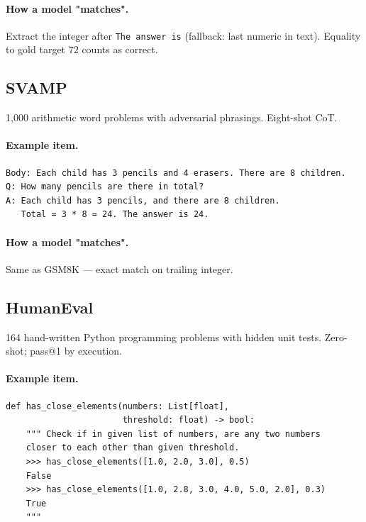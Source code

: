 \paragraph{How a model "matches".} Extract the integer after
\verb|The answer is| (fallback: last numeric in text). Equality to
gold target $72$ counts as correct.

\subsection{SVAMP}
\label{app:ex-svamp}

1{,}000 arithmetic word problems with adversarial phrasings.
Eight-shot CoT.

\paragraph{Example item.}
\begin{verbatim}
Body: Each child has 3 pencils and 4 erasers. There are 8 children.
Q: How many pencils are there in total?
A: Each child has 3 pencils, and there are 8 children.
   Total = 3 * 8 = 24. The answer is 24.
\end{verbatim}

\paragraph{How a model "matches".} Same as GSM8K — exact match on
trailing integer.

\subsection{HumanEval}
\label{app:ex-humaneval}

164 hand-written Python programming problems with hidden unit
tests. Zero-shot; pass@1 by execution.

\paragraph{Example item.}
\begin{verbatim}
def has_close_elements(numbers: List[float],
                       threshold: float) -> bool:
    """ Check if in given list of numbers, are any two numbers
    closer to each other than given threshold.
    >>> has_close_elements([1.0, 2.0, 3.0], 0.5)
    False
    >>> has_close_elements([1.0, 2.8, 3.0, 4.0, 5.0, 2.0], 0.3)
    True
    """
\end{verbatim}

